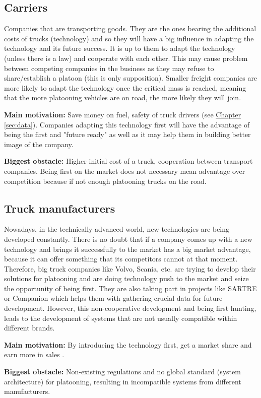 \subsection{Carriers}
Companies that are transporting goods. They are the ones bearing the additional costs of trucks (technology) and so they will have a big influence in adapting the technology and its future success. It is up to them to adapt the technology (unless there is a law) and cooperate with each other. This may cause problem between competing companies in the business as they may refuse to share/establish a platoon (this is only supposition). Smaller freight companies are more likely to adapt the technology once the critical mass is reached, meaning that the more platooning vehicles are on road, the more likely they will join.
% 
\par \textbf{Main motivation:} Save money on fuel, safety of truck drivers (see \hyperref[sec:data]{Chapter} \ref{sec:data}). Companies adapting this technology first will have the advantage of being the first and "future ready" as well as it may help them in building better image of the company. 
% 
\par \textbf{Biggest obstacle:} Higher initial cost of a truck, cooperation between transport companies. Being first on the market does not necessary mean advantage over competition because if not enough platooning trucks on the road.
% 
\subsection{Truck manufacturers}
Nowadays, in the technically advanced world, new technologies are being developed constantly. There is no doubt that if a company comes up with a new technology and brings it successfully to the market has a big market advantage, because it can offer something that its competitors cannot at that moment. Therefore, big truck companies like Volvo, Scania, etc. are trying to develop their solutions for platooning and are doing technology push to the market and seize the opportunity of being first. They are also taking part in projects like SARTRE \cite{Chan2012ProjectSARTRE} or Companion \cite{2016CompanionProject} which helps them with gathering crucial data for future development. However, this non-cooperative development and being first hunting, leads to the development of systems that are not usually compatible within different brands.\par
% 
\par \textbf{Main motivation:} By introducing the technology first, get a market share and earn more in sales \cite{Banbury1995TheSurvival}.\par
% 
\par \textbf{Biggest obstacle:} Non-existing regulations and no global standard (system architecture) for platooning, resulting in incompatible systems from different manufacturers.\par
% 
